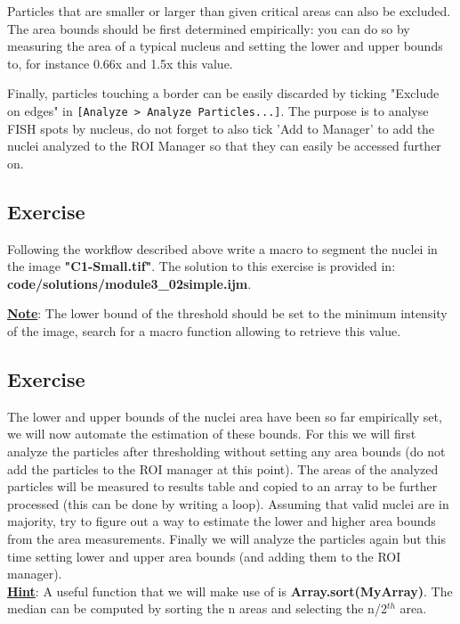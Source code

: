 \documentclass[11pt,a4paper,oneside]{report}
\newcommand{\ijmenu}[1]{\texttt{\small#1}}
\begin{document}
\begin{enumerate}
    Particles that are smaller or larger than given critical areas can also be excluded. The area bounds should be first determined empirically: you can do so by measuring the area of a typical nucleus and setting the lower and upper bounds to, for instance 0.66x and 1.5x this value. 
    
    Finally, particles touching a border can be easily discarded by ticking "Exclude on edges" in \ijmenu{[Analyze > Analyze Particles...]}. The purpose is to analyse FISH spots by nucleus, do not forget to also tick 'Add to Manager' to add the nuclei analyzed to the ROI Manager so that they can easily be accessed further on.
    

\end{enumerate}
\subsection{Exercise }
Following the workflow described above write a macro to segment the nuclei in the image \textbf{"C1-Small.tif"}. The solution to this exercise is provided in: \textbf{code/solutions/module3\_02simple.ijm}.

\textbf{\underline{Note}}: The lower bound of the threshold should be set to the minimum intensity of the image, search for a macro function allowing to retrieve this value.
\subsection{Exercise }

The lower and upper bounds of the nuclei area have been so far empirically set, we will now automate the estimation of these bounds. For this we will first analyze the particles after thresholding without setting any area bounds (do not add the particles to the ROI manager at this point). The areas of the analyzed particles will be measured to results table and copied to an array to be further processed (this can be done by writing a loop). Assuming that valid nuclei are in majority, try to figure out a way to estimate the lower and higher area bounds from the area measurements. Finally we will analyze the particles again but this time setting lower and upper area bounds (and adding them to the ROI manager).\\

\textbf{\underline{Hint}}: A useful function that we will make use of is \textbf{Array.sort(MyArray)}. The median can be computed by sorting the n areas and selecting the n/2$^{th}$ area.\\
 
\end{document}
